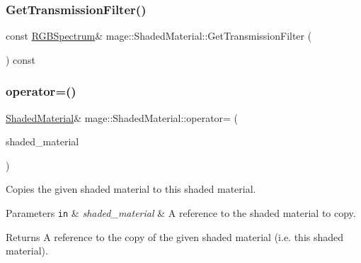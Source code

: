 \hypertarget{structmage_1_1_shaded_material_ac1735260a6d52bacbaea76594f7fbfdb}{}\label{structmage_1_1_shaded_material_ac1735260a6d52bacbaea76594f7fbfdb} 
\subsubsection{\texorpdfstring{Get\+Transmission\+Filter()}{GetTransmissionFilter()}\hspace{0.1cm}{\footnotesize\ttfamily [2/2]}}
{\footnotesize\ttfamily const \hyperlink{structmage_1_1_r_g_b_spectrum}{R\+G\+B\+Spectrum}\& mage\+::\+Shaded\+Material\+::\+Get\+Transmission\+Filter (\begin{DoxyParamCaption}{ }\end{DoxyParamCaption}) const\hspace{0.3cm}{\ttfamily [noexcept]}}

\hypertarget{structmage_1_1_shaded_material_ade9ec3ee6aae198e695240a5b89a0d72}{}\label{structmage_1_1_shaded_material_ade9ec3ee6aae198e695240a5b89a0d72} 
\subsubsection{\texorpdfstring{operator=()}{operator=()}\hspace{0.1cm}{\footnotesize\ttfamily [1/2]}}
{\footnotesize\ttfamily \hyperlink{structmage_1_1_shaded_material}{Shaded\+Material}\& mage\+::\+Shaded\+Material\+::operator= (\begin{DoxyParamCaption}\item[{const \hyperlink{structmage_1_1_shaded_material}{Shaded\+Material} \&}]{shaded\+\_\+material }\end{DoxyParamCaption})\hspace{0.3cm}{\ttfamily [default]}}

Copies the given shaded material to this shaded material.


\begin{DoxyParams}[1]{Parameters}
\mbox{\tt in}  & {\em shaded\+\_\+material} & A reference to the shaded material to copy. \\
\hline
\end{DoxyParams}
\begin{DoxyReturn}{Returns}
A reference to the copy of the given shaded material (i.\+e. this shaded material). 
\end{DoxyReturn}
\hypertarget{structmage_1_1_shaded_material_a29fb482ab140fcb47709ffda03a67714}{}\label{structmage_1_1_shaded_material_a29fb482ab140fcb47709ffda03a67714} 
